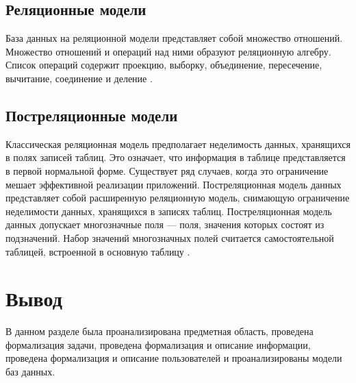 \subsection{Реляционные модели}
База данных на реляционной модели представляет собой множество отношений.
Множество отношений и операций над ними образуют реляционную алгебру.
Список операций содержит проекцию, выборку, объединение, пересечение, вычитание, соединение и деление \cite{dbms}.

\subsection{Постреляционные модели}
Классическая реляционная модель предполагает неделимость данных, хранящихся в полях записей таблиц.
Это означает, что информация в таблице представляется в первой нормальной форме.
Существует ряд случаев, когда это ограничение мешает эффективной реализации приложений.
Постреляционная модель данных представляет собой расширенную реляционную модель, снимающую ограничение неделимости данных, хранящихся в записях таблиц.
Постреляционная модель данных допускает многозначные поля --- поля, значения которых состоят из подзначений.
Набор значений многозначных полей считается самостоятельной таблицей, встроенной в основную таблицу \cite{voroneg}.
 
\section*{Вывод}
В данном разделе была проанализирована предметная область, проведена формализация задачи, проведена формализация и описание информации, проведена формализация и описание пользователей и проанализированы модели баз данных. 

 

